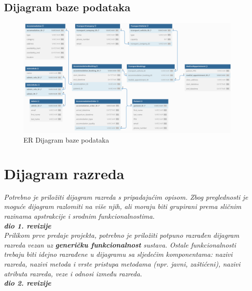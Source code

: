 				
			
			\subsection{Dijagram baze podataka}

				\begin{figure}[H]
					\includegraphics[scale=0.32]{slike/dijagram_baze.png} %
					\centering
					\caption{ER Dijagram baze podataka}
					\label{fig:dijagram_baze_podataka}
				\end{figure}
			
			\eject
			
			
		\section{Dijagram razreda}
		
			\textit{Potrebno je priložiti dijagram razreda s pripadajućim opisom. Zbog preglednosti je moguće dijagram razlomiti na više njih, ali moraju biti grupirani prema sličnim razinama apstrakcije i srodnim funkcionalnostima.}\\
			
			\textbf{\textit{dio 1. revizije}}\\
			
			\textit{Prilikom prve predaje projekta, potrebno je priložiti potpuno razrađen dijagram razreda vezan uz \textbf{generičku funkcionalnost} sustava. Ostale funkcionalnosti trebaju biti idejno razrađene u dijagramu sa sljedećim komponentama: nazivi razreda, nazivi metoda i vrste pristupa metodama (npr. javni, zaštićeni), nazivi atributa razreda, veze i odnosi između razreda.}\\
			
			\textbf{\textit{dio 2. revizije}}\\			
			
